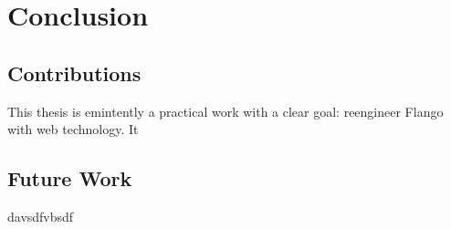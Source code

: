 \chapter{Conclusion}
\section{Contributions}
This thesis is emintently a practical work with a clear goal: reengineer Flango \cm with web technology.
It 

\section{Future Work}

davsdfvbsdf